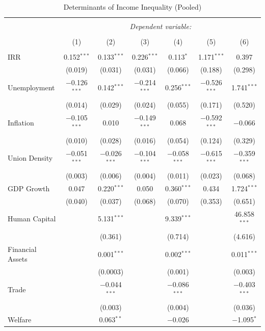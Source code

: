 \documentclass[
  11pt,
]{article}
\begin{document}
\begin{table}[!htbp] \centering 
  \caption{\label{ineq2}Determinants of Income Inequality (Pooled)} 
  \label{} 
\small 
\begin{tabular}{@{\extracolsep{5pt}}lcccccc} 
\\[-1.8ex]\hline 
\hline \\[-1.8ex] 
 & \multicolumn{6}{c}{\textit{Dependent variable:}} \\ 
\cline{2-7} 
\\[-1.8ex] & (1) & (2) & (3) & (4) & (5) & (6)\\ 
\hline \\[-1.8ex] 
 IRR & 0.152$^{***}$ & 0.133$^{***}$ & 0.226$^{***}$ & 0.113$^{*}$ & 1.171$^{***}$ & 0.397 \\ 
  & (0.019) & (0.031) & (0.031) & (0.066) & (0.188) & (0.298) \\ 
  Unemployment & $-$0.126$^{***}$ & 0.142$^{***}$ & $-$0.214$^{***}$ & 0.256$^{***}$ & $-$0.526$^{***}$ & 1.741$^{***}$ \\ 
  & (0.014) & (0.029) & (0.024) & (0.055) & (0.171) & (0.520) \\ 
  Inflation & $-$0.105$^{***}$ & 0.010 & $-$0.149$^{***}$ & 0.068 & $-$0.592$^{***}$ & $-$0.066 \\ 
  & (0.010) & (0.028) & (0.016) & (0.054) & (0.124) & (0.329) \\ 
  Union Density & $-$0.051$^{***}$ & $-$0.026$^{***}$ & $-$0.104$^{***}$ & $-$0.058$^{***}$ & $-$0.615$^{***}$ & $-$0.359$^{***}$ \\ 
  & (0.003) & (0.006) & (0.004) & (0.011) & (0.023) & (0.068) \\ 
  GDP Growth & 0.047 & 0.220$^{***}$ & 0.050 & 0.360$^{***}$ & 0.434 & 1.724$^{***}$ \\ 
  & (0.040) & (0.037) & (0.068) & (0.070) & (0.353) & (0.651) \\ 
  Human Capital &  & 5.131$^{***}$ &  & 9.339$^{***}$ &  & 46.858$^{***}$ \\ 
  &  & (0.361) &  & (0.714) &  & (4.616) \\ 
  Financial Assets &  & 0.001$^{***}$ &  & 0.002$^{***}$ &  & 0.011$^{***}$ \\ 
  &  & (0.0003) &  & (0.001) &  & (0.003) \\ 
  Trade &  & $-$0.044$^{***}$ &  & $-$0.086$^{***}$ &  & $-$0.403$^{***}$ \\ 
  &  & (0.003) &  & (0.004) &  & (0.036) \\ 
  Welfare &  & 0.063$^{**}$ &  & $-$0.026 &  & $-$1.095$^{*}$ \\ 

\end{tabular}
\end{table}
\end{document}
